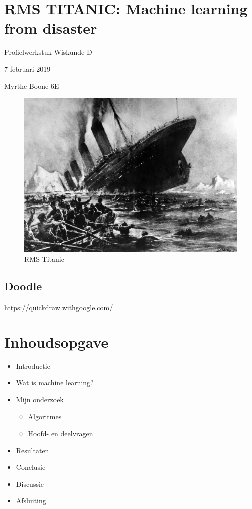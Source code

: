 \documentclass[11pt]{article}
\author{Myrthe Boone}
\date{\today}
\title{}
\begin{document}
\section*{RMS TITANIC: Machine learning from disaster}
\label{sec:org1dce408}
Profielwerkstuk Wiskunde D  

7 februari 2019

Myrthe Boone 6E

\begin{figure}[htbp]
\centering
\includegraphics[width=.9\linewidth]{./Titanic.png}
\caption{RMS Titanic}
\end{figure}

\subsection*{Doodle}
\label{sec:org7b0b2c9}
\url{https://quickdraw.withgoogle.com/}

\section*{Inhoudsopgave}
\label{sec:orgccecb10}

\begin{itemize}
\item Introductie
\item Wat is machine learning?
\item Mijn onderzoek
\begin{itemize}
\item Algoritmes
\item Hoofd- en deelvragen
\end{itemize}
\item Resultaten
\item Conclusie
\item Discussie
\item Afsluiting
\end{itemize}
\end{document}
